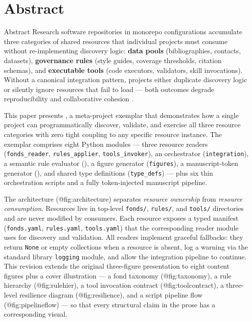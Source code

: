 \documentclass[
  ignorenonframetext,
]{beamer}
\author{\texorpdfstring{}{}}
\date{}
\begin{document}
\section{Abstract}\label{abstract}

\begin{frame}{Abstract}
Research software repositories in monorepo configurations accumulate
three categories of shared resources that individual projects must
consume without re-implementing discovery logic: \textbf{data pools}
(bibliographies, contacts, datasets), \textbf{governance rules} (style
guides, coverage thresholds, citation schemas), and \textbf{executable
tools} (code executors, validators, skill invocations). Without a
canonical integration pattern, projects either duplicate discovery logic
or silently ignore resources that fail to load --- both outcomes degrade
reproducibility and collaborative cohesion .

This paper presents , a
meta-project exemplar that demonstrates how a single project can
programmatically discover, validate, and exercise all three resource
categories with zero tight coupling to any specific resource instance.
The exemplar comprises eight Python modules --- three resource readers
(\texttt{fonds\_reader}, \texttt{rules\_applier},
\texttt{tools\_invoker}), an orchestrator (\texttt{integration}), a
semantic rule evaluator (), a figure
generator (\texttt{figures}), a manuscript-token generator
(), and shared type definitions
(\texttt{type\_defs}) --- plus six thin orchestration scripts and a
fully token-injected manuscript pipeline.

The architecture (@fig:architecture) separates \emph{resource ownership}
from \emph{resource consumption}. Resources live in top-level
\texttt{fonds/}, \texttt{rules/}, and \texttt{tools/} directories and
are never modified by consumers. Each resource exposes a typed manifest
(\texttt{fonds.yaml}, \texttt{rules.yaml}, \texttt{tools.yaml}) that the
corresponding reader module uses for discovery and validation. All
readers implement graceful fallbacks: they return \texttt{None} or empty
collections when a resource is absent, log a warning via the standard
library \texttt{logging} module, and allow the integration pipeline to
continue. This revision extends the original three-figure presentation
to eight content figures plus a cover illustration --- a fond taxonomy
(@fig:taxonomy), a rule hierarchy (@fig:rulehier), a tool invocation
contract (@fig:toolcontract), a three-level resilience diagram
(@fig:resilience), and a script pipeline flow (@fig:pipelineflow) --- so
that every structural claim in the prose has a corresponding visual.


\end{frame}
\end{document}
